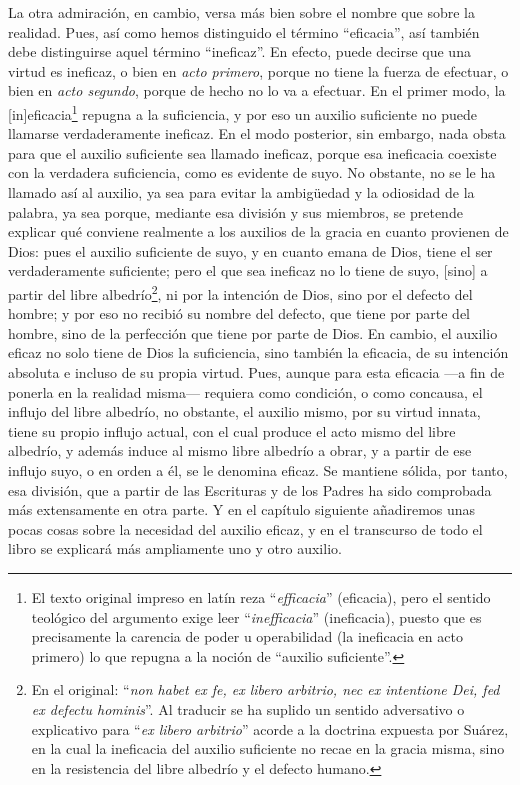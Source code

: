 \documentclass{article}
\begin{document}
La otra admiración, en cambio, versa más bien sobre el nombre que sobre la realidad.
Pues, así como hemos distinguido el término \enquote{eficacia}, así también debe
distinguirse aquel término \enquote{ineficaz}. En efecto, puede decirse que una virtud
es ineficaz, o bien en \textit{acto primero}, porque no tiene la fuerza de efectuar, o
bien en \textit{acto segundo}, porque de hecho no lo va a efectuar. En el primer modo,
la [in]eficacia\footnote{El texto original impreso en latín reza
\enquote{\textit{efficacia}} (eficacia), pero el sentido teológico del argumento exige
leer \enquote{\textit{inefficacia}} (ineficacia), puesto que es precisamente la carencia
de poder u operabilidad (la ineficacia en acto primero) lo que repugna a la noción de
\enquote{auxilio suficiente}.} repugna a la suficiencia, y por eso un auxilio suficiente
no puede llamarse verdaderamente ineficaz. En el modo posterior, sin embargo, nada obsta
para que el auxilio suficiente sea llamado ineficaz, porque esa ineficacia coexiste con
la verdadera suficiencia, como es evidente de suyo. No obstante, no se le ha llamado así
al auxilio, ya sea para evitar la ambigüedad y la odiosidad de la palabra, ya sea
porque, mediante esa división y sus miembros, se pretende explicar qué conviene
realmente a los auxilios de la gracia en cuanto provienen de Dios: pues el auxilio
suficiente de suyo, y en cuanto emana de Dios, tiene el ser verdaderamente suficiente;
pero el que sea ineficaz no lo tiene de suyo, [sino] a partir del libre
albedrío\footnote{En el original: \enquote{\textit{non habet ex fe, ex libero arbitrio,
nec ex intentione Dei, fed ex defectu hominis}}. Al traducir se ha suplido un sentido
adversativo o explicativo para \enquote{\textit{ex libero arbitrio}} acorde a la
doctrina expuesta por Suárez, en la cual la ineficacia del auxilio suficiente no recae
en la gracia misma, sino en la resistencia del libre albedrío y el defecto humano.}, ni
por la intención de Dios, sino por el defecto del hombre; y por eso no recibió su nombre
del defecto, que tiene por parte del hombre, sino de la perfección que tiene por parte
de Dios. En cambio, el auxilio eficaz no solo tiene de Dios la suficiencia, sino también
la eficacia, de su intención absoluta e incluso de su propia virtud. Pues, aunque para
esta eficacia —a fin de ponerla en la realidad misma— requiera como condición, o como
concausa, el influjo del libre albedrío, no obstante, el auxilio mismo, por su virtud
innata, tiene su propio influjo actual, con el cual produce el acto mismo del libre
albedrío, y además induce al mismo libre albedrío a obrar, y a partir de ese influjo
suyo, o en orden a él, se le denomina eficaz. Se mantiene sólida, por tanto, esa
división, que a partir de las Escrituras y de los Padres ha sido comprobada más
extensamente en otra parte. Y en el capítulo siguiente añadiremos unas pocas cosas sobre
la necesidad del auxilio eficaz, y en el transcurso de todo el libro se explicará más
ampliamente uno y otro auxilio.
\end{document}

